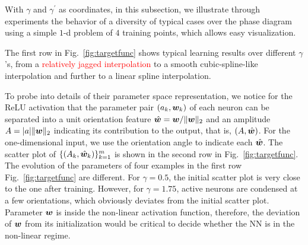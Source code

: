 \documentclass{article}
\begin{document}
With $\gamma$ and $\gamma^{\prime}$ as coordinates, in this subsection, we illustrate through experiments the behavior of a diversity of typical cases over the phase diagram using a simple $1$-d problem of $4$ training points, which allows easy visualization. 

The first row in Fig.~\ref{fig:targetfunc} shows typical learning results over different $\gamma$'s, from a \textcolor{red}{relatively jagged interpolation} to a smooth cubic-spline-like interpolation and further to a linear spline interpolation. 

To probe into details of their parameter space representation, we notice for the ReLU activation that the parameter pair $(a_k,\bm{w}_k)$ of each neuron can be separated into a unit orientation feature $\hat{\bm{w}}=\bm{w}/\lVert\bm{w}\rVert_{2}$ and an amplitude $A=|a|\lVert\bm{w}\rVert_{2}$ indicating its contribution to the output, that is, $(A,\hat{\bm{w}})$. For the one-dimensional input, we use the orientation angle to indicate each $\hat{\bm{w}}$. The scatter plot of $\{(A_k,\hat{\bm{w}}_k)\}_{k=1}^{m}$ is shown in the second row in Fig.~\ref{fig:targetfunc}. The evolution of the parameters of four examples in the first row Fig.~\ref{fig:targetfunc} are different. For $\gamma=0.5$, the initial scatter plot is very close to the one after training. However, for $\gamma=1.75$, active neurons are condensed at a few orientations, which obviously deviates from the initial scatter plot. Parameter $\bm{w}$ is inside the non-linear activation function, therefore, the deviation of $\bm{w}$ from its initialization would be critical to decide whether the NN is in the non-linear regime. 
\end{document}
